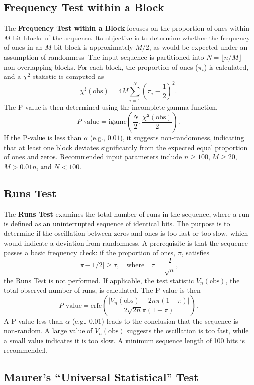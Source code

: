 \subsection{Frequency Test within a Block}

The \textbf{Frequency Test within a Block} focuses on the proportion of ones within $M$-bit blocks of the sequence. Its objective is to determine whether the frequency of ones in an $M$-bit block is approximately $M/2$, as would be expected under an assumption of randomness. The input sequence is partitioned into $N = \lfloor n/M \rfloor$ non-overlapping blocks. For each block, the proportion of ones ($\pi_i$) is calculated, and a $\chi^2$ statistic is computed as
\[
\chi^2(\text{obs}) = 4M \sum_{i=1}^{N} \left(\pi_i - \frac{1}{2}\right)^2.
\]
The P-value is then determined using the incomplete gamma function,
\[
P\text{-value} = \text{igamc}\left(\frac{N}{2}, \frac{\chi^2(\text{obs})}{2}\right).
\]
If the P-value is less than $\alpha$ (e.g., $0.01$), it suggests non-randomness, indicating that at least one block deviates significantly from the expected equal proportion of ones and zeros. Recommended input parameters include $n \ge 100$, $M \ge 20$, $M > 0.01n$, and $N < 100$.

\subsection{Runs Test}

The \textbf{Runs Test} examines the total number of runs in the sequence, where a run is defined as an uninterrupted sequence of identical bits. The purpose is to determine if the oscillation between zeros and ones is too fast or too slow, which would indicate a deviation from randomness. A prerequisite is that the sequence passes a basic frequency check: if the proportion of ones, $\pi$, satisfies
\[
|\pi - 1/2| \ge \tau, \quad \text{where} \quad \tau = \frac{2}{\sqrt{n}},
\]
the Runs Test is not performed. If applicable, the test statistic $V_n(\text{obs})$, the total observed number of runs, is calculated. The P-value is then
\[
P\text{-value} = \text{erfc}\left(\frac{|V_n(\text{obs}) - 2n\pi(1-\pi)|}{2\sqrt{2n}\pi(1-\pi)}\right).
\]
A P-value less than $\alpha$ (e.g., $0.01$) leads to the conclusion that the sequence is non-random. A large value of $V_n(\text{obs})$ suggests the oscillation is too fast, while a small value indicates it is too slow. A minimum sequence length of 100 bits is recommended.

\subsection{Maurer's ``Universal Statistical'' Test}

